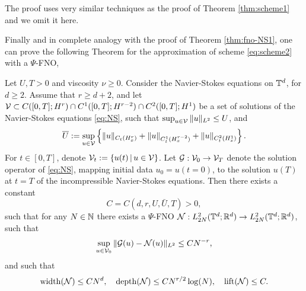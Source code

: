 \documentclass[reqno,a4paper]{amsart}
\begin{document}
The proof uses very similar techniques as the proof of Theorem \ref{thm:scheme1} and we omit it here. 

Finally and in complete analogy with the proof of Theorem \ref{thm:fno-NS1}, one can prove the following Theorem for the approximation of scheme \eqref{eq:scheme2} with a $\Psi$-FNO,
\begin{theorem} \label{thm:fno-NS2}
Let $U,T>0$ and viscosity $\nu \ge 0$. Consider the Navier-Stokes equations on $\mathbb{T}^d$, for $d\ge 2$. Assume that $r\ge d+2$, and let $\mathcal{V} \subset C([0,T]; H^r) \cap C^1([0,T];H^{r-2}) \cap C^2([0,T];H^1)$ be a set of solutions of the Navier-Stokes equations \eqref{eq:NS}, such that $\sup_{u\in \mathcal{V}} \Vert u \Vert_{L^2}\le U$, and 
\[
\overline{U}:= \sup_{u\in \mathcal{V}} \left\{
\Vert u \Vert_{C_t(H^r_x)} + \Vert u \Vert_{C^1_t(H^{r-2}_x)} + \Vert u \Vert_{C^2_t(H^{1}_x)}
\right\}.
\]
For $t\in [0,T]$, denote $\mathcal{V}_t := {\left\{ u(t) \,\middle|\, u\in \mathcal{V} \right\}}$. Let $\mathcal{G}: \mathcal{V}_0 \to \mathcal{V}_T$ denote the solution operator of \eqref{eq:NS}, mapping initial data $u_0 = u(t=0)$, to the solution $u(T)$ at $t=T$ of the incompressible Navier-Stokes equations. Then there exists a constant 
\[
C = C(d,r,U,\bar{U},T) > 0,
\]
such that for any $N\in \mathbb{N}$ there exists a $\Psi$-FNO $\mathcal{N}: L^2_{2N}(\mathbb{T}^d;\mathbb{R}^d) \to L^2_{2N}(\mathbb{T}^d;\mathbb{R}^d)$, such that 
\[
\sup_{u\in \mathcal{V}_0}
\Vert \mathcal{G}(u) - \mathcal{N}(u) \Vert_{L^2}
\le
C N^{-r},
\]
and such that 
\[
\mathrm{width}(\mathcal{N}) \le C N^{d}, 
\quad
\mathrm{depth}(\mathcal{N}) \le C N^{r/2} \log(N),
\quad
\mathrm{lift}(\mathcal{N}) \le C.
\]
\end{theorem}
\end{document}
